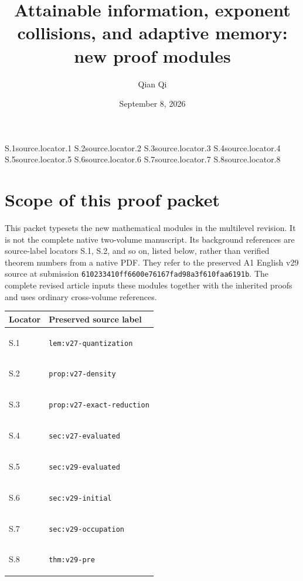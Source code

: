 
\title[New proofs: attainable information]{Attainable information, exponent collisions, and adaptive memory:\\new proof modules}
\author{Qian Qi}
\date{September 8, 2026}
\makeatletter
\expandafter\gdef\csname r@lem:v27-quantization\endcsname{{S.1}{}{}{source.locator.1}{}}
\expandafter\gdef\csname r@prop:v27-density\endcsname{{S.2}{}{}{source.locator.2}{}}
\expandafter\gdef\csname r@prop:v27-exact-reduction\endcsname{{S.3}{}{}{source.locator.3}{}}
\expandafter\gdef\csname r@sec:v27-evaluated\endcsname{{S.4}{}{}{source.locator.4}{}}
\expandafter\gdef\csname r@sec:v29-evaluated\endcsname{{S.5}{}{}{source.locator.5}{}}
\expandafter\gdef\csname r@sec:v29-initial\endcsname{{S.6}{}{}{source.locator.6}{}}
\expandafter\gdef\csname r@sec:v29-occupation\endcsname{{S.7}{}{}{source.locator.7}{}}
\expandafter\gdef\csname r@thm:v29-pre\endcsname{{S.8}{}{}{source.locator.8}{}}
\makeatother


\maketitle
\section*{Scope of this proof packet}
This packet typesets the new mathematical modules in the multilevel
revision. It is not the complete native two-volume manuscript.
Its background references are source-label locators S.1, S.2, and so on,
listed below, rather than verified theorem numbers from a native PDF.
They refer to the preserved A1 English v29 source at submission
\texttt{610233410ff6600e76167fad98a3f610faa6191b}.
The complete revised article inputs these modules together with the
inherited proofs and uses ordinary cross-volume references.

\begin{center}\small
\begin{tabular}{@{}ll@{}}\toprule
Locator & Preserved source label\\\midrule
\hypertarget{source.locator.1}{}S.1 & \texttt{lem:v27-quantization} \\
\hypertarget{source.locator.2}{}S.2 & \texttt{prop:v27-density} \\
\hypertarget{source.locator.3}{}S.3 & \texttt{prop:v27-exact-reduction} \\
\hypertarget{source.locator.4}{}S.4 & \texttt{sec:v27-evaluated} \\
\hypertarget{source.locator.5}{}S.5 & \texttt{sec:v29-evaluated} \\
\hypertarget{source.locator.6}{}S.6 & \texttt{sec:v29-initial} \\
\hypertarget{source.locator.7}{}S.7 & \texttt{sec:v29-occupation} \\
\hypertarget{source.locator.8}{}S.8 & \texttt{thm:v29-pre} \\
\bottomrule\end{tabular}\end{center}


